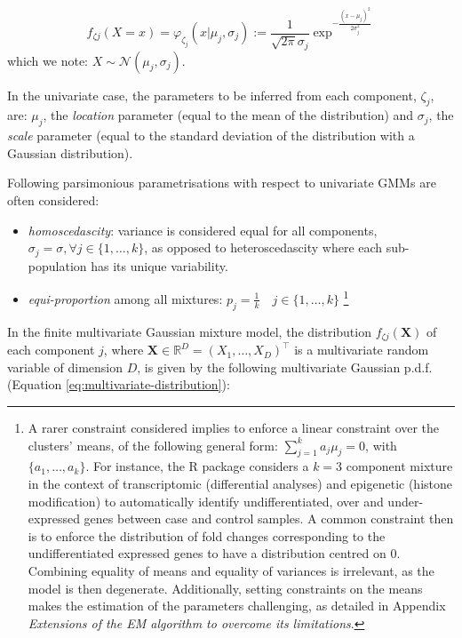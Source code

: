 \begin{equation}
f_{\zeta j}(X=x)=\varphi_{\zeta_j}(x | \mu_j, \sigma_j):=\frac{1}{\sqrt{2\pi} \sigma_j} \exp^{- \frac{(x - \mu_j)^2}{2 \sigma_j^2}}
\label{eq:gaussian-dist}
\end{equation} which we note: \(X \sim \mathcal{N}(\mu_j, \sigma_j)\).

In the univariate case, the parameters to be inferred from each
component, \(\zeta_j\), are: \(\mu_j\), the \emph{location} parameter (equal to
the mean of the distribution) and \(\sigma_j\), the \emph{scale} parameter
(equal to the standard deviation of the distribution with a Gaussian distribution).

Following parsimonious parametrisations with respect to univariate GMMs
are often considered:

\begin{itemize}
\item
  \emph{homoscedascity}: variance is considered equal for all components,
  \(\sigma_j = \sigma, \forall j \in \{1, \ldots, k \}\), as opposed to
  heteroscedascity where each sub-population has its unique
  variability.
\item
  \emph{equi-proportion} among all mixtures:
  \(p_j = \frac{1}{k} \quad j \in \{ 1, \ldots, k\}\) \footnote{A rarer constraint considered implies to enforce a linear
    constraint over the clusters' means, of the following general form:
    \(\sum_{j=1}^k a_j \mu_j=0\), with \(\{a_1, \ldots, a_k\}\). For
    instance, the R package  considers a \(k=3\) component
    mixture in the context of transcriptomic (differential analyses) and
    epigenetic (histone modification) to automatically identify
    undifferentiated, over and under-expressed genes between case and
    control samples. A common constraint then is to enforce the
    distribution of fold changes corresponding to the undifferentiated
    expressed genes to have a distribution centred on 0. Combining
    equality of means and equality of variances is irrelevant, as the
    model is then degenerate. Additionally, setting constraints on the
    means makes the estimation of the parameters challenging, as
    detailed in Appendix \emph{Extensions of the EM algorithm to overcome its limitations}.}
\end{itemize}

In the finite multivariate Gaussian mixture model, the distribution \(f_{\zeta j}(\boldsymbol{X})\) of each component \(j\), where
\(\boldsymbol{X} \in \mathbb{R}^D =(X_1, \ldots, X_D)^\top\) is a multivariate random variable
of dimension \(D\), is given by the
following multivariate Gaussian p.d.f.
(Equation \eqref{eq:multivariate-distribution}):

